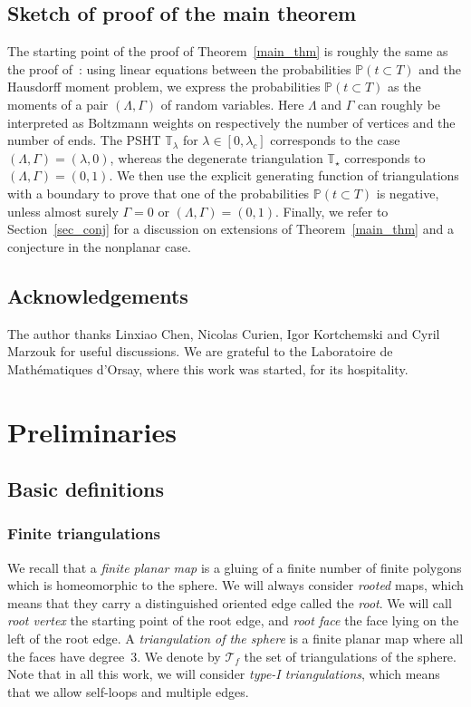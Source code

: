 \documentclass[AHL,Unicode,longabstracts,published]{cedram}
\newcommand{\T}{\mathcal{T}}
\newcommand{\TT}{\mathbb{T}}
\renewcommand{\P}{\mathbb{P}}
\begin{document}
\subsection*{Sketch of proof of the main theorem} The starting point of the proof of Theorem~\ref{main_thm} is roughly the same as the proof of~\cite[Theorem~2]{BL19}: using linear equations between the probabilities $\P(t \subset T)$ and the Hausdorff moment problem, we express the probabilities $\P (t \subset T )$ as the moments of a pair $(\Lambda, \Gamma)$ of random variables. Here $\Lambda$ and $\Gamma$ can roughly be interpreted as Boltzmann weights on respectively the number of vertices and the number of ends. The PSHT $\TT_{\lambda}$ for $\lambda \in [0,\lambda_c]$ corresponds to the case $(\Lambda, \Gamma)=(\lambda,0)$, whereas the degenerate triangulation $\TT_{\star}$ corresponds to $(\Lambda, \Gamma)=(0,1)$. We then use the explicit generating function of triangulations with a boundary to prove that one of the probabilities $\P (t \subset T)$ is negative, unless almost surely $\Gamma=0$ or $(\Lambda, \Gamma)=(0,1)$. Finally, we refer to Section~\ref{sec_conj} for a discussion on extensions of Theorem~\ref{main_thm} and a conjecture in the nonplanar case.


\subsection*{Acknowledgements}
The author thanks Linxiao Chen, Nicolas Curien, Igor Kortchemski and Cyril Marzouk for useful discussions. We are grateful to the Laboratoire de Mathématiques d'Orsay, where this work was started, for its hospitality.

\section{Preliminaries}\label{sec_prelim}

\subsection{Basic definitions}\label{subsec_defns}

\subsubsection*{Finite triangulations}
We recall that a \emph{finite planar map} is a gluing of a finite number of finite polygons which is homeomorphic to the sphere. We will always consider \emph{rooted} maps, which means that they carry a distinguished oriented edge called the \emph{root}. We will call \emph{root vertex} the starting point of the root edge, and \emph{root face} the face lying on the left of the root edge. A \emph{triangulation of the sphere} is a finite planar map where all the faces have degree~$3$. We denote by $\T_f$ the set of triangulations of the sphere. Note that in all this work, we will consider \emph{type-I triangulations}, which means that we allow self-loops and multiple edges.
\end{document}
